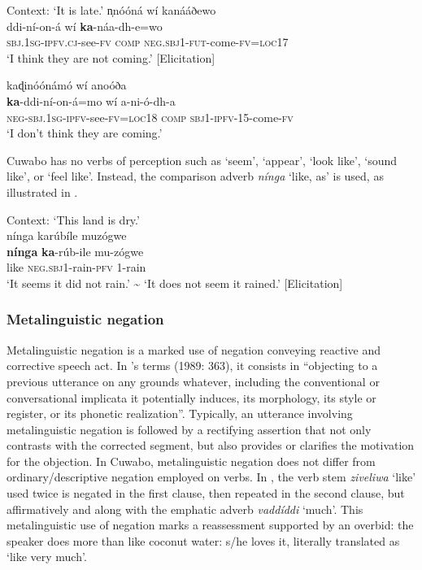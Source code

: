 \documentclass[output=paper,colorlinks=true, citecolor=brown,draftmode]{langscibook}
\begin{document}
\ea\label{ex:cuw:83}
    Context: ‘It is late.’ %
    \ea\label{ex:cuw:83a} n̩nóóná wí kanááðewo\\ 
        \gll ddi-ní-on-á wí \textbf{ka}{}-náa-dh-e=wo \\
               \textsc{sbj.1sg-ipfv.cj}{}-see-\textsc{fv} \textsc{comp} \textsc{neg.sbj1-fut-}come-\textsc{fv=loc17}\\
        \glt  ‘I think they are not coming.’ [Elicitation]

    \ex\label{ex:cuw:83b} kaɖinóónámó wí anoóða \\
        \gll \textbf{ka}{}-ddi-ní-on-á=mo wí a-ni-ó-dh-a \\
               \textsc{neg-sbj.1sg-ipfv}{}-see-\textsc{fv=loc18} \textsc{comp} \textsc{sbj1-ipfv-15-}come-\textsc{fv}\\
        \glt  ‘I don’t think they are coming.’
    \z
\z 

Cuwabo has no verbs of perception such as ‘seem’, ‘appear’, ‘look like’, ‘sound like’, or ‘feel like’. Instead, the comparison adverb \textit{nínga} ‘like, as’ is used, as illustrated in . 

\ea\label{ex:cuw:84} Context: ‘This land is dry.’\\%
        nínga karúbíle muzógwe \\ 
    \gll  \textbf{nínga} \textbf{ka}{}-rúb-ile mu-zógwe\\
          like \textsc{neg.sbj1}{}-rain-\textsc{pfv} 1-rain\\
    \glt ‘It seems it did not rain.’ {\textasciitilde} ‘It does not seem it rained.’ [Elicitation]
\z 

\subsubsection{Metalinguistic negation}\label{sec:cuw:4.6.2}
Metalinguistic negation is a marked use of negation conveying reactive and corrective speech act. In \citeauthor{Horn1989}’s terms (1989: 363), it consists in “objecting to a previous utterance on any grounds whatever, including the conventional or conversational implicata it potentially induces, its morphology, its style or register, or its phonetic realization”. Typically, an utterance involving metalinguistic negation is followed by a rectifying assertion that not only contrasts with the corrected segment, but also provides or clarifies the motivation for the objection. In Cuwabo, metalinguistic negation does not differ from ordinary/descriptive negation employed on verbs. In , the verb stem \textit{ziveliwa} ‘like’ used twice is negated in the first clause, then repeated in the second clause, but affirmatively and along with the emphatic adverb \textit{vaddíddi} ‘much’. This metalinguistic use of negation marks a reassessment supported by an overbid: the speaker does more than like coconut water: s/he loves it, literally translated as ‘like very much’. 
\end{document}
